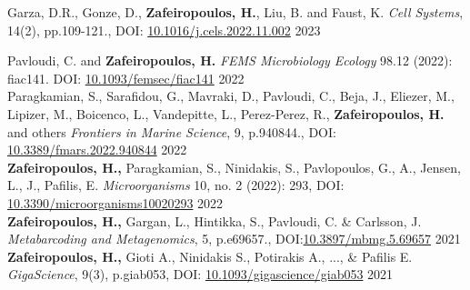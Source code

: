 \documentclass[
	a4paper,
]{fortysecondscv}
\begin{document}
\begin{cvtable}

	{Garza, D.R., Gonze, D., \textbf{Zafeiropoulos, H.}, Liu, B. and Faust, K.}
	{\textit{Cell Systems}, 14(2), pp.109-121., DOI: \href{https://doi.org/10.1016/j.cels.2022.11.002}{10.1016/j.cels.2022.11.002}}
	{2023}

	{Pavloudi, C. and \textbf{Zafeiropoulos, H.} }
	{\textit{FEMS Microbiology Ecology} 98.12 (2022): fiac141. DOI: \href{https://doi.org/10.1093/femsec/fiac141}{10.1093/femsec/fiac141}}
	{2022} \\

	{Paragkamian, S., Sarafidou, G., Mavraki, D., Pavloudi, C., Beja, J., Eliezer, M., Lipizer, M., Boicenco, L., Vandepitte, L., Perez-Perez, R., \textbf{Zafeiropoulos, H.} and others}
	{\textit{Frontiers in Marine Science}, 9, p.940844., DOI: \href{https://doi.org/10.3389/fmars.2022.940844}{10.3389/fmars.2022.940844}}
	{2022} \\

	{\textbf{Zafeiropoulos, H.,} Paragkamian, S., Ninidakis, S., Pavlopoulos, G., A., Jensen, L., J., Pafilis, E. }
	{\textit{Microorganisms} 10, no. 2 (2022): 293, DOI: \href{10.3390/microorganisms10020293}{10.3390/microorganisms10020293}}
	{2022} \\

	{\textbf{Zafeiropoulos, H.,} Gargan, L., Hintikka, S., Pavloudi, C. \& Carlsson, J.}
	{\textit{Metabarcoding and Metagenomics}, 5, p.e69657., DOI:\href{https://doi.org/10.3897/mbmg.5.69657}{10.3897/mbmg.5.69657}}
	{2021} \\

	{\textbf{Zafeiropoulos, H.,} Gioti A., Ninidakis S., Potirakis A., ..., \& Pafilis E.}
	{\textit{GigaScience}, 9(3), p.giab053, DOI: \href{https://doi.org/10.1093/gigascience/giab053}{10.1093/gigascience/giab053}}
	{2021} \\


\end{cvtable}
\end{document}
